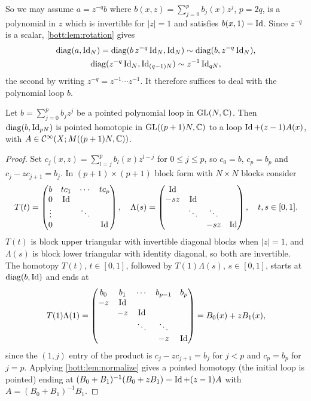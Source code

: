 So we may assume $a=z^{-q}b$ where $b(x,z)=\sum_{j=0}^{p}b_j(x)z^j$, $p=2q$, is a
polynomial in $z$ which is invertible for $|z|=1$ and satisfies $b(x,1)=\operatorname{Id}$. Since
$z^{-q}$ is a scalar, \cref{bott:lem:rotation} gives
\begin{gather*}
  \operatorname{diag}(a,\operatorname{Id}_N)=\operatorname{diag}(b\,z^{-q}\operatorname{Id}_N,\operatorname{Id}_N)\sim\operatorname{diag}(b,z^{-q}\operatorname{Id}_N),\\
  \operatorname{diag}(z^{-q}\operatorname{Id}_N,\operatorname{Id}_{(q-1)N})\sim z^{-1}\operatorname{Id}_{qN},
\end{gather*}
the second by writing $z^{-q}=z^{-1}\cdots z^{-1}$. It therefore suffices to deal
with the polynomial loop $b$.

\begin{lemma}\label{bott:lem:poly-linear}
  Let $b=\sum_{j=0}^pb_jz^j$ be a pointed polynomial loop in $\operatorname{GL}(N,\mathbb{C})$. Then
  $\operatorname{diag}(b,\operatorname{Id}_{pN})$ is pointed homotopic in $\operatorname{GL}((p+1)N,\mathbb{C})$ to a loop
  $\operatorname{Id}+(z-1)A(x)$, with $A\in\mathcal{C}^\infty(X;M((p+1)N,\mathbb{C}))$.
\end{lemma}
\begin{proof}
  Set $c_j(x,z)=\sum_{l=j}^pb_l(x)z^{l-j}$ for $0\le j\le p$, so $c_0=b$, $c_p=b_p$
  and $c_j-zc_{j+1}=b_j$. In $(p+1)\times(p+1)$ block form with $N\times N$ blocks
  consider
  \begin{equation*}
    T(t)=\begin{pmatrix}b&tc_1&\cdots&tc_p\\0&\operatorname{Id}&&\\\vdots&&\ddots&\\0&&&\operatorname{Id}\end{pmatrix},\quad
    \Lambda(s)=\begin{pmatrix}\operatorname{Id}&&&\\-sz&\operatorname{Id}&&\\&\ddots&\ddots&\\&&-sz&\operatorname{Id}\end{pmatrix},
    \quad t,s\in[0,1].
  \end{equation*}
  $T(t)$ is block upper triangular with invertible diagonal blocks when $|z|=1$, and
  $\Lambda(s)$ is block lower triangular with identity diagonal, so both are invertible.
  The homotopy $T(t)$, $t\in[0,1]$, followed by $T(1)\Lambda(s)$, $s\in[0,1]$, starts
  at $\operatorname{diag}(b,\operatorname{Id})$ and ends at
  \begin{equation*}
    T(1)\Lambda(1)=\begin{pmatrix}b_0&b_1&\cdots&b_{p-1}&b_p\\-z&\operatorname{Id}&&&\\&-z&\operatorname{Id}&&\\&&\ddots&\ddots&\\&&&-z&\operatorname{Id}\end{pmatrix}
    =B_0(x)+zB_1(x),
  \end{equation*}
  since the $(1,j)$ entry of the product is $c_j-zc_{j+1}=b_j$ for $j<p$ and $c_p=b_p$
  for $j=p$. Applying \cref{bott:lem:normalize} gives a pointed homotopy (the initial
  loop is pointed) ending at $(B_0+B_1)^{-1}(B_0+zB_1)=\operatorname{Id}+(z-1)A$ with
  $A=(B_0+B_1)^{-1}B_1$.
\end{proof}

